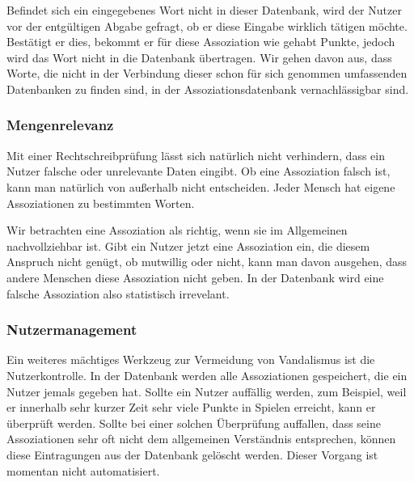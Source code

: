 Befindet sich ein eingegebenes Wort nicht in dieser Datenbank, wird der Nutzer vor der entgültigen Abgabe gefragt, ob er diese Eingabe wirklich tätigen möchte. Bestätigt er dies, bekommt er für diese Assoziation wie gehabt Punkte, jedoch wird das Wort nicht in die Datenbank übertragen. Wir gehen davon aus, dass Worte, die nicht in der Verbindung dieser schon für sich genommen umfassenden Datenbanken zu finden sind, in der Assoziationsdatenbank vernachlässigbar sind.


\subsubsection{Mengenrelevanz}
Mit einer Rechtschreibprüfung lässt sich natürlich nicht verhindern, dass ein Nutzer falsche oder unrelevante Daten eingibt. Ob eine Assoziation falsch ist, kann man natürlich von außerhalb nicht entscheiden. Jeder Mensch hat eigene Assoziationen zu bestimmten Worten.

Wir betrachten eine Assoziation als richtig, wenn sie im Allgemeinen nachvollziehbar ist. Gibt ein Nutzer jetzt eine Assoziation ein, die diesem Anspruch nicht genügt, ob mutwillig oder nicht, kann man davon ausgehen, dass andere Menschen diese Assoziation nicht geben. In der Datenbank wird eine falsche Assoziation also statistisch irrevelant.

\subsubsection{Nutzermanagement}
Ein weiteres mächtiges Werkzeug zur Vermeidung von Vandalismus ist die Nutzerkontrolle. In der Datenbank werden alle Assoziationen gespeichert, die ein Nutzer jemals gegeben hat. Sollte ein Nutzer auffällig werden, zum Beispiel, weil er innerhalb sehr kurzer Zeit sehr viele Punkte in Spielen erreicht, kann er überprüft werden. Sollte bei einer solchen Überprüfung auffallen, dass seine Assoziationen sehr oft nicht dem allgemeinen Verständnis entsprechen, können diese Eintragungen aus der Datenbank gelöscht werden. Dieser Vorgang ist momentan nicht automatisiert.